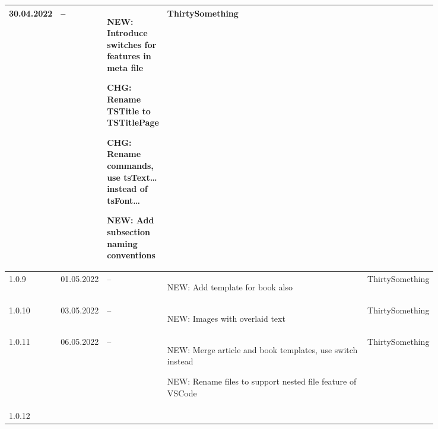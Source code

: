 \begin{tiny}
\begin{longtable}{ | p{0.06\linewidth} | p{0.08\linewidth} | p{0.06\linewidth} | P{0.49\linewidth} | p{0.15\linewidth} | }
        30.04.2022               &
        --                       &
        \begin{tsLTItemize}
            \item NEW: Introduce switches for features in meta file
            \item CHG: Rename TSTitle to TSTitlePage
            \item CHG: Rename commands, use tsText\ldots instead of tsFont\ldots
            \item NEW: Add subsection naming conventions
        \end{tsLTItemize}
                                 &
        ThirtySomething            \\
        \hline
        1.0.9                    &
        01.05.2022               &
        --                       &
        \begin{tsLTItemize}
            \item NEW: Add template for book also
        \end{tsLTItemize}
                                 &
        ThirtySomething            \\
        \hline
        1.0.10                   &
        03.05.2022               &
        --                       &
        \begin{tsLTItemize}
            \item NEW: Images with overlaid text
        \end{tsLTItemize}
                                 &
        ThirtySomething            \\
        \hline
        1.0.11                   &
        06.05.2022               &
        --                       &
        \begin{tsLTItemize}
            \item NEW: Merge article and book templates, use switch instead
            \item NEW: Rename files to support nested file feature of VSCode
        \end{tsLTItemize}
                                 &
        ThirtySomething            \\
        \hline
        1.0.12                   &

\end{longtable}
\end{tiny}
